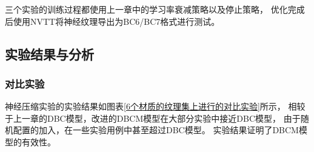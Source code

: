 三个实验的训练过程都使用上一章中的学习率衰减策略以及停止策略，
优化完成后使用NVTT将神经纹理导出为BC6/BC7格式进行测试。

\subsection{实验结果与分析}

\subsubsection{对比实验}
\label{4:对比实验}

神经压缩实验的实验结果如图表\ref{6个材质的纹理集上进行的对比实验}所示，
相较于上一章的DBC模型，改进的DBCM模型在大部分实验中接近DBC模型，
由于随机配置的加入，在一些实验用例中甚至超过DBC模型。
实验结果证明了DBCM模型的有效性。

